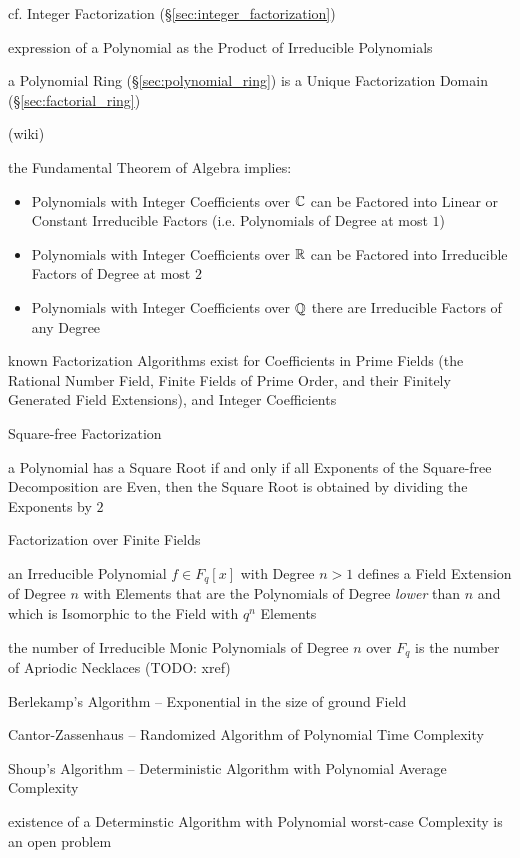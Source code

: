 cf. Integer Factorization (\S\ref{sec:integer_factorization})

expression of a Polynomial as the Product of Irreducible Polynomials

a Polynomial Ring (\S\ref{sec:polynomial_ring}) is a Unique Factorization Domain
(\S\ref{sec:factorial_ring})

(wiki)

the Fundamental Theorem of Algebra implies:
\begin{itemize}
  \item Polynomials with Integer Coefficients over $\mathbb{C}$ can be Factored into
    Linear or Constant Irreducible Factors (i.e. Polynomials of Degree at most
    $1$)
  \item Polynomials with Integer Coefficients over $\mathbb{R}$ can be Factored into
    Irreducible Factors of Degree at most $2$
  \item Polynomials with Integer Coefficients over $\mathbb{Q}$ there are Irreducible
    Factors of any Degree
\end{itemize}

known Factorization Algorithms exist for Coefficients in Prime Fields (the
Rational Number Field, Finite Fields of Prime Order, and their Finitely
Generated Field Extensions), and Integer Coefficients

Square-free Factorization

a Polynomial has a Square Root if and only if all Exponents of the Square-free
Decomposition are Even, then the Square Root is obtained by dividing the
Exponents by $2$

Factorization over Finite Fields

an Irreducible Polynomial $f \in F_q[x]$ with Degree $n > 1$ defines a Field
Extension of Degree $n$ with Elements that are the Polynomials of Degree
\emph{lower} than $n$ and which is Isomorphic to the Field with $q^n$ Elements

the number of Irreducible Monic Polynomials of Degree $n$ over $F_q$ is the
number of Apriodic Necklaces (TODO: xref)

Berlekamp's Algorithm -- Exponential in the size of ground Field

Cantor-Zassenhaus -- Randomized Algorithm of Polynomial Time Complexity

Shoup's Algorithm -- Deterministic Algorithm with Polynomial Average Complexity

existence of a Determinstic Algorithm with Polynomial worst-case Complexity is
an open problem



